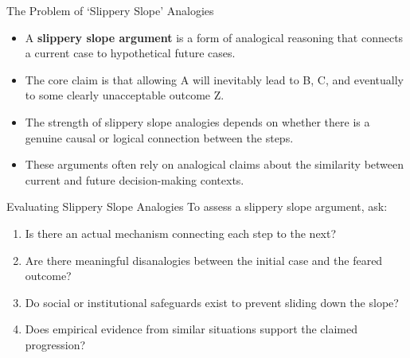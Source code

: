\documentclass{beamer}
\begin{document}
\begin{frame}{The Problem of `Slippery Slope' Analogies}
	\begin{itemize}
		\item A \textbf{slippery slope argument} is a form of analogical reasoning that connects a current case to hypothetical future cases.
		\item The core claim is that allowing A will inevitably lead to B, C, and eventually to some clearly unacceptable outcome Z.
		\item The strength of slippery slope analogies depends on whether there is a genuine causal or logical connection between the steps.
		\item These arguments often rely on analogical claims about the similarity between current and future decision-making contexts.
	\end{itemize}
	
	\begin{alertblock}{Evaluating Slippery Slope Analogies}
		\scriptsize
		To assess a slippery slope argument, ask:
		\begin{enumerate}
			\item Is there an actual mechanism connecting each step to the next?
			\item Are there meaningful disanalogies between the initial case and the feared outcome?
			\item Do social or institutional safeguards exist to prevent sliding down the slope?
			\item Does empirical evidence from similar situations support the claimed progression?
		\end{enumerate}
	\end{alertblock}
\end{frame}
\end{document}
